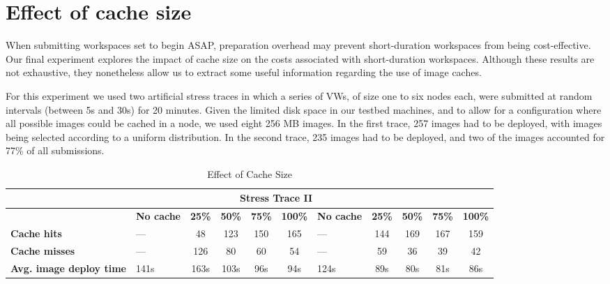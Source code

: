 \documentclass[singlespace]{ccw_chithesis}
\begin{document}
\section{Effect of cache size}

When submitting workspaces set to begin ASAP, preparation overhead may
prevent short{}-duration workspaces from being cost{}-effective. Our
final experiment explores the impact of cache size on the costs
associated with short{}-duration workspaces. Although these results are
not exhaustive, they nonetheless allow us to extract some useful
information regarding the use of image caches.

For this experiment we used two artificial stress traces in which a
series of VWs, of size one to six nodes each, were submitted at random
intervals (between 5s and 30s) for 20 minutes. Given the limited disk
space in our testbed machines, and to allow for a configuration where
all possible images could be cached in a node, we used eight 256 MB
images. In the first trace, 257 images had to be deployed, with images
being selected according to a uniform distribution. In the second
trace, 235 images had to be deployed, and two of the images accounted
for 77\% of all submissions.

\begin{table}
\begin{center}
\begin{tabular}{|>{\centering}m{}|>{\centering}m{}|c|c|c|c||>{\centering}m{}|c|c|c|c|}
\cline{2-11}
\multicolumn{1}{c|}{} &
\multicolumn{5}{c||}{\bfseries Stress Trace I} &
\multicolumn{5}{c|}{\bfseries Stress Trace II}

\\\cline{2-11}

\multicolumn{1}{c|}{}  & 
{\bfseries No cache} & {\bfseries 25\%} & {\bfseries 50\%} & {\bfseries 75\%} & {\bfseries 100\%} &
{\bfseries No cache} & {\bfseries 25\%} & {\bfseries 50\%} & {\bfseries 75\%} & {\bfseries 100\%}
\\\hline

{\bfseries Cache hits} & --- & 48 & 123 & 150 & 165 & --- & 144 & 169 & 167 & 159 

\\\hline

{\bfseries Cache misses} & --- & 126 & 80 & 60 & 54 & --- & 59 & 36 & 39 & 42

\\\hline

{\bfseries Avg. image deploy time} & 141s & 163s & 103s & 96s & 94s & 124s & 89s & 80s & 81s & 86s

\\\hline
\end{tabular}

\caption{Effect of Cache Size}
\label{tab:cache}
\end{center}
\end{table}
\end{document}
